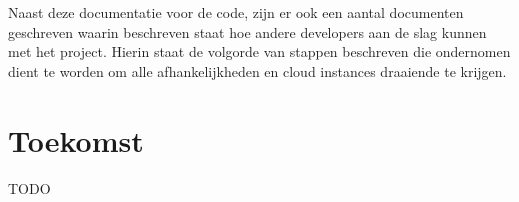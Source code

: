 Naast deze documentatie voor de code, zijn er ook een aantal documenten geschreven waarin beschreven staat hoe andere developers aan de slag kunnen met het project. Hierin staat de volgorde van stappen beschreven die ondernomen dient te worden om alle afhankelijkheden en cloud instances draaiende te krijgen.

\section{Toekomst}

{\par \bigskip \par \color{red} TODO \par \bigskip \par }
